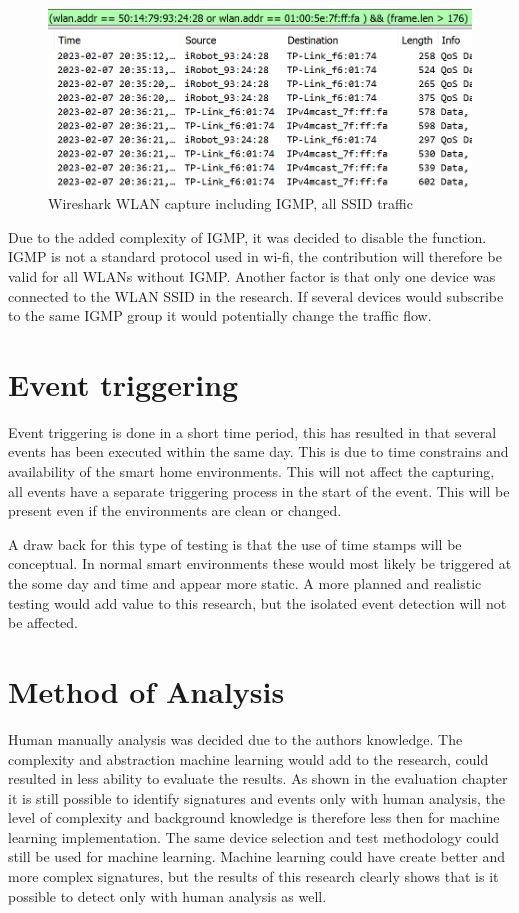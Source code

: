 \begin{figure}[H]
    \centering
    \includegraphics[width=\textwidth]{figures/WLAN_IGMP_ALL.png}
    \caption{Wireshark WLAN capture including IGMP, all SSID traffic}
    \label{fig:WLANIGMP_all_enabled}
\end{figure}

Due to the added complexity of IGMP, it was decided to disable the function. IGMP is not a standard protocol used in wi-fi, the contribution will therefore be valid for all WLANs without IGMP. Another factor is that only one device was connected to the WLAN SSID in the research. If several devices would subscribe to the same IGMP group it would potentially change the traffic flow.

\section{Event triggering}
Event triggering is done in a short time period, this has resulted in that several events has been executed within the same day. This is due to time constrains and availability of the smart home environments. This will not affect the capturing, all events have a separate triggering process in the start of the event. This will be present even if the environments are clean or changed.

A draw back for this type of testing is that the use of time stamps will be conceptual. In normal smart environments these would most likely be triggered at the some day and time and appear more static. A more planned and realistic testing would add value to this research, but the isolated event detection will not be affected. 

\section{Method of Analysis}
Human manually analysis was decided due to the authors knowledge. The complexity and abstraction machine learning would add to the research, could resulted in less ability to evaluate the results. As shown in the evaluation chapter it is still possible to identify signatures and events only with human analysis, the level of complexity and background knowledge is therefore less then for machine learning implementation. The same device selection and test methodology could still be used for machine learning. Machine learning could have create better and more complex signatures, but the results of this research clearly shows that is it possible to detect only with human analysis as well. 

